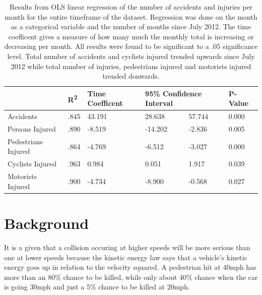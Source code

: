 \documentclass[10pt,journal,compsoc]{IEEEtran}
\begin{document}
\begin{table}[]
\centering
\caption{Results from OLS linear regression of the number of accidents and injuries per month for the entire timeframe of the dataset.  Regression was done on the month as a categorical variable and the number of months since July 2012.  The time coefficent gives a measure of how many much the monthly total is increasing or decreasing per month.  All results were found to be significant to a .05 significance level.  Total number of accidents and cyclists injured trended upwards since July 2012 while total number of injuries, pedestrians injured and motorists injured trended donwards. }
\label{tab:timeline}
\begin{tabular}{|l|l|l|l|l|l|}
\hline
                    & R\textsuperscript{2}   & Time Coefficent & \multicolumn{2}{l|}{95\% Confidence Interval} & P-Value \\ \hline
Accidents           & .845 & 43.191          & 28.638                 & 57.744               & 0.000   \\ \hline
Persons Injured     & .890 & -8.519          & -14.202                & -2.836               & 0.005   \\ \hline
Pedestrians Injured & .864 & -4.769          & -6.512                 & -3.027               & 0.000   \\ \hline
Cyclists Injured    & .963 & 0.984           & 0.051                  & 1.917                & 0.039   \\ \hline
Motorists Injured   & .900 & -4.734          & -8.900                 & -0.568               & 0.027   \\ \hline
\end{tabular}
\end{table}






\section{Background}

It is a given that a collision occuring at higher speeds will be more serious than one at lower speeds because the kinetic energy law says that a vehicle's kinetic energy goes up in relation to the velocity squared. A pedestrian hit at 40mph has more than an 80\% chance to be killed, while only about 40\% chance when the car is going 30mph and just a 5\% chance to be killed at 20mph\cite{fatalityrates}.
\end{document}
